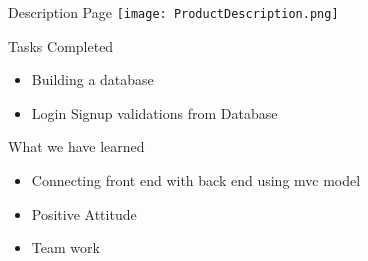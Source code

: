 \documentclass[14pt]{beamer}
\begin{document}
\begin{frame}{Description Page}
\texttt{[image: ProductDescription.png]}
\end{frame}

\begin{frame}{Tasks Completed}
 \begin{itemize}
  \item {
    Building a database
  }
  \item {
    Login Signup validations from Database
  }
  \end{itemize}
\end{frame}


\begin{frame}{What we have learned}
    \begin{itemize}
        \item{Connecting front end with back end using mvc model}
        \item{Positive Attitude}
        \item{Team work}
    \end{itemize}
\end{frame}
\end{document}
